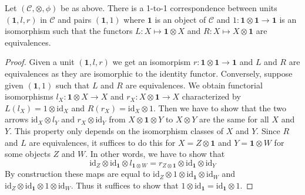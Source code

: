 \begin{lemma}
\label{lemma-monoidal-unit}
Let $(\mathcal{C}, \otimes, \phi)$ be as above. There is a 1-to-1
correspondence between units $(\mathbf{1}, l, r)$ in $\mathcal{C}$ and pairs
$(\mathbf{1}, 1)$ where $\mathbf{1}$ is an object of $\mathcal{C}$ and
$1 : \mathbf{1} \otimes \mathbf{1} \to \mathbf{1}$
is an isomorphism such that the functors $L : X \mapsto \mathbf{1} \otimes X$
and $R : X \mapsto X \otimes \mathbf{1}$ are equivalences.
\end{lemma}

\begin{proof}
Given a unit $(\mathbf{1}, l, r)$ we get an isomorpism
$r : \mathbf{1} \otimes \mathbf{1} \to \mathbf{1}$ and $L$ and $R$ are
equivalences as they are isomorphic to the identity functor.
Conversely, suppose given $(\mathbf{1}, 1)$ such that
$L$ and $R$ are equivalences. We obtain functorial isomorphisms
$l_X : \mathbf{1} \otimes X \to X$ and $r_X : X \otimes \mathbf{1} \to X$
characterized by $L(l_X) = 1 \otimes \text{id}_X$ and
$R(r_X) = \text{id}_X \otimes 1$. Then we have to show that the two
arrows $\text{id}_X \otimes l_Y$ and $r_X \otimes \text{id}_Y$ from
$X \otimes \mathbf{1} \otimes Y$ to $X \otimes Y$ are the same
for all $X$ and $Y$. This property only depends on the isomorphism
classes of $X$ and $Y$.
Since $R$ and $L$ are equivalences, it suffices to
do this for $X = Z \otimes \mathbf{1}$ and $Y = \mathbf{1} \otimes W$
for some objects $Z$ and $W$.
In other words, we have to show that
$$
\text{id}_Z \otimes \text{id}_\mathbf{1} \otimes l_{\mathbf{1} \otimes W}
=
r_{Z \otimes \mathbf{1}} \otimes \text{id}_\mathbf{1} \otimes \text{id}_Y
$$
By construction these maps are equal to
$\text{id}_Z \otimes 1 \otimes \text{id}_\mathbf{1} \otimes \text{id}_W$ and
$\text{id}_Z \otimes \text{id}_\mathbf{1} \otimes 1 \otimes \text{id}_W$.
Thus it suffices to show that
$1 \otimes \text{id}_\mathbf{1} = \text{id}_\mathbf{1} \otimes 1$.


\end{proof}
